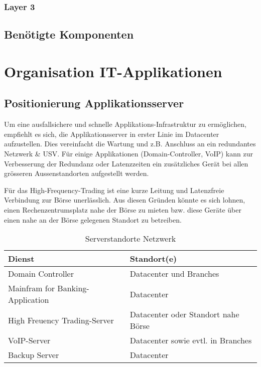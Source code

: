 \subsubsection{Layer 3}

\subsection{Benötigte Komponenten}

\section{Organisation IT-Applikationen}

\subsection{Positionierung Applikationsserver}

Um eine ausfallsichere und schnelle Applikations-Infrastruktur zu ermöglichen, empfiehlt es sich, die Applikationsserver in erster Linie im Datacenter aufzustellen. Dies vereinfacht die Wartung und z.B. Anschluss an ein redundantes Netzwerk \& USV. Für einige Applikationen (Domain-Controller, VoIP) kann zur Verbesserung der Redundanz oder Latenzzeiten ein zusätzliches Gerät bei allen grösseren Aussenstandorten aufgestellt werden.

Für das High-Frequency-Trading ist eine kurze Leitung und Latenzfreie Verbindung zur Börse unerlässlich. Aus diesen Gründen könnte es sich lohnen, einen Rechenzentrumsplatz nahe der Börse zu mieten bzw. diese Geräte über einen nahe an der Börse gelegenen Standort zu betreiben.

\begin{table}[h]
	\centering
	\begin{tabu} to \linewidth {l l}
		\toprule 
		Dienst & Standort(e) \\
		\midrule
		Domain Controller & Datacenter und Branches \\
		Mainfram for Banking-Application & Datacenter \\
		High Freuency Trading-Server & Datacenter oder Standort nahe Börse \\
		VoIP-Server & Datacenter sowie evtl. in Branches\\
		Backup Server & Datacenter \\
		\bottomrule 
	\end{tabu} 
	\label{tbl:server_standorte}
	\caption{Serverstandorte Netzwerk}
\end{table}

